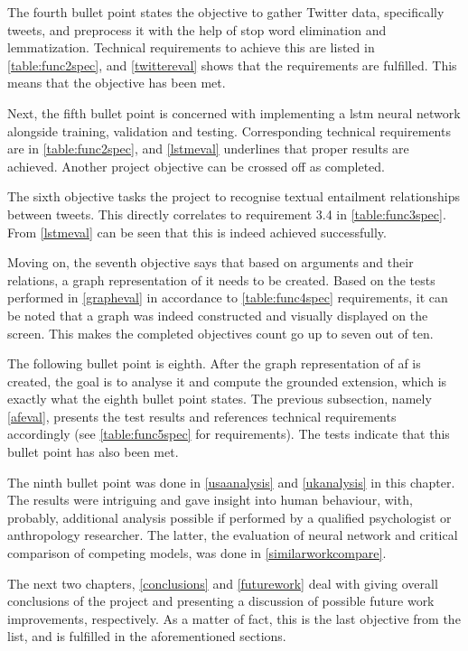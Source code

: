        The fourth bullet point states the objective to gather Twitter data, specifically tweets, and preprocess it with the help of stop word elimination and lemmatization. Technical requirements to achieve this are listed in \cref{table:func2spec}, and \cref{twittereval} shows that the requirements are fulfilled. This means that the objective has been met.
        
        Next, the fifth bullet point is concerned with implementing a \gls{lstm} neural network alongside training, validation and testing. Corresponding technical requirements are in \cref{table:func2spec}, and \cref{lstmeval} underlines that proper results are achieved. Another project objective can be crossed off as completed.
        
        The sixth objective tasks the project to recognise textual entailment relationships between tweets. This directly correlates to requirement 3.4 in \cref{table:func3spec}. From \cref{lstmeval} can be seen that this is indeed achieved successfully.
        
        Moving on, the seventh objective says that based on arguments and their relations, a graph representation of it needs to be created. Based on the tests performed in \cref{grapheval} in accordance to \cref{table:func4spec} requirements, it can be noted that a graph was indeed constructed and visually displayed on the screen. This makes the completed objectives count go up to seven out of ten.
        
        The following bullet point is eighth. After the graph representation of \gls{af} is created, the goal is to analyse it and compute the grounded extension, which is exactly what the eighth bullet point states. The previous subsection, namely \cref{afeval}, presents the test results and references technical requirements accordingly (see \cref{table:func5spec} for requirements). The tests indicate that this bullet point has also been met.
        
        The ninth bullet point was done in \cref{usaanalysis} and \cref{ukanalysis} in this chapter. The results were intriguing and gave insight into human behaviour, with, probably, additional analysis possible if performed by a qualified psychologist or anthropology researcher. The latter, the evaluation of neural network and critical comparison of competing models, was done in \cref{similarworkcompare}.
        
        The next two chapters, \cref{conclusions} and \cref{futurework} deal with giving overall conclusions of the project and presenting a discussion of possible future work improvements, respectively. As a matter of fact, this is the last objective from the list, and is fulfilled in the aforementioned sections.